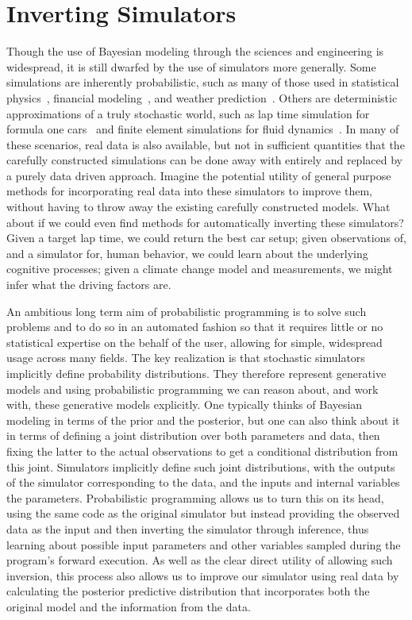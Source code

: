 
\section{Inverting Simulators}
\label{sec:probprog:inv}

Though the use of Bayesian modeling through the sciences and engineering is widespread,
it is still dwarfed by the use of simulators more generally.  Some simulations are inherently
probabilistic, such as many of those used in statistical physics~\citep{landau2014guide},
 financial modeling~\citep{jackel2002monte}, and weather prediction~\cite{evensen1994sequential}.  
 Others are deterministic approximations
of a truly stochastic world, such as lap time simulation for formula one cars~\citep{perantoni2014optimal}
and finite element simulations for fluid dynamics~\citep{versteeg2007introduction}.
In many of these scenarios, real data is also available, but not in sufficient quantities that the carefully
constructed simulations can be done away with entirely and replaced by a purely data driven
approach.  
Imagine the potential utility of general purpose methods for incorporating real data
into these simulators to improve them, without having to throw away the existing carefully constructed models.  
What about if we could even find methods for automatically
inverting these simulators?  Given a target lap time, we could return the best car setup; given observations
of, and a simulator for, human behavior, we could learn about the underlying cognitive processes; given
a climate change model and measurements, we might infer what the driving factors are.  

An ambitious long
term aim of probabilistic programming is to solve such problems and to do so in an automated fashion
so that it requires little or no statistical expertise on the behalf of the user, allowing for simple, widespread usage
across many fields.  The key realization is that stochastic simulators implicitly define probability distributions.
They therefore represent generative models and using probabilistic programming we can reason about, and
work with, these generative models explicitly.  One typically thinks of Bayesian modeling in terms of the
prior and the posterior, but one can also think about it in terms of defining a joint distribution over
both parameters and data, then fixing the latter to the actual observations to get a conditional distribution from
this joint.  Simulators implicitly define such joint distributions, with the outputs of the simulator corresponding
to the data, and the inputs and internal variables the parameters.  Probabilistic programming allows us to turn this on its head,
using the same code as the original simulator but instead providing the observed data as the input and
then inverting the simulator through inference, thus learning about possible input parameters and other 
variables sampled during the program's forward execution.  
As well as the clear direct utility of allowing such inversion, this process also allows us to improve
our simulator using real data by calculating the posterior predictive distribution that incorporates both
the original model and the information from the data.

